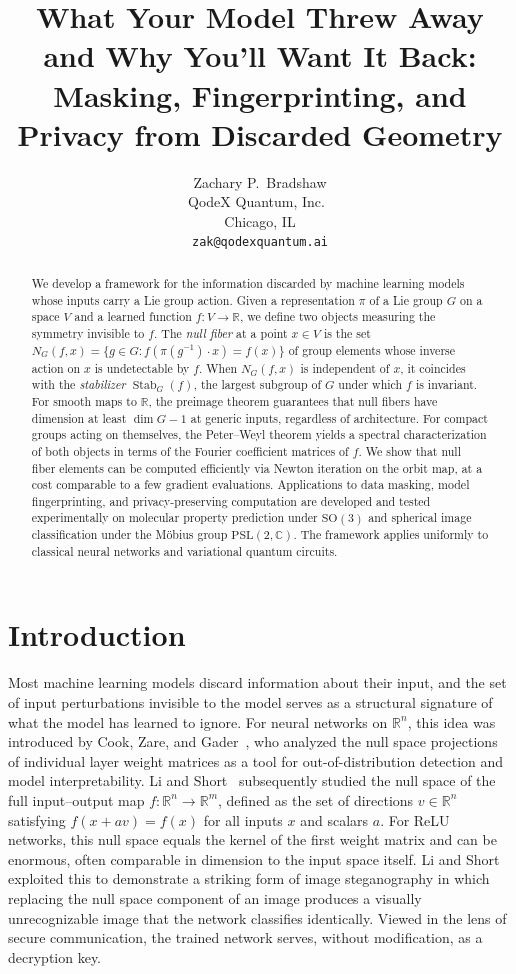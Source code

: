 \documentclass[11pt]{article}
\title{What Your Model Threw Away and Why You'll Want It Back: Masking, Fingerprinting, and Privacy from Discarded Geometry}
\author{
Zachary P.\ Bradshaw \\
QodeX Quantum, Inc.\ \\
Chicago, IL \\
\texttt{zak@qodexquantum.ai}
}
\date{}
\DeclareMathOperator{\Stab}{Stab}
\newcommand{\CC}{\mathbb{C}}
\newcommand{\RR}{\mathbb{R}}
\begin{document}
\maketitle

\begin{abstract}
We develop a framework for the information discarded by machine learning models whose inputs carry a Lie group action. Given a representation $\pi$ of a Lie group $G$ on a space $V$ and a learned function $f\colon V \to \RR$, we define two objects measuring the symmetry invisible to $f$. The \emph{null fiber} at a point $x \in V$ is the set $N_G(f,x) = \{g \in G : f(\pi(g^{-1}) \cdot x) = f(x)\}$ of group elements whose inverse action on $x$ is undetectable by $f$. When $N_G(f,x)$ is independent of $x$, it coincides with the \emph{stabilizer} $\Stab_G(f)$, the largest subgroup of $G$ under which $f$ is invariant. For smooth maps to $\RR$, the preimage theorem guarantees that null fibers have dimension at least $\dim G - 1$ at generic inputs, regardless of architecture. For compact groups acting on themselves, the Peter--Weyl theorem yields a spectral characterization of both objects in terms of the Fourier coefficient matrices of $f$. We show that null fiber elements can be computed efficiently via Newton iteration on the orbit map, at a cost comparable to a few gradient evaluations. Applications to data masking, model fingerprinting, and privacy-preserving computation are developed and tested experimentally on molecular property prediction under $\mathrm{SO}(3)$ and spherical image classification under the M\"obius group $\mathrm{PSL}(2, \CC)$. The framework applies uniformly to classical neural networks and variational quantum circuits.
\end{abstract}

\section{Introduction}\label{sec:intro}

Most machine learning models discard information about their input, and the set of input perturbations invisible to the model serves as a structural signature of what the model has learned to ignore. For neural networks on $\RR^n$, this idea was introduced by Cook, Zare, and Gader~\cite{cook2025competency,cook2020outlier}, who analyzed the null space projections of individual layer weight matrices as a tool for out-of-distribution detection and model interpretability. Li and Short~\cite{li2025null} subsequently studied the null space of the full input--output map $f\colon \RR^n \to \RR^m$, defined as the set of directions $v \in \RR^n$ satisfying $f(x + av) = f(x)$ for all inputs $x$ and scalars $a$. For ReLU networks, this null space equals the kernel of the first weight matrix and can be enormous, often comparable in dimension to the input space itself. Li and Short exploited this to demonstrate a striking form of image steganography in which replacing the null space component of an image produces a visually unrecognizable image that the network classifies identically. Viewed in the lens of secure communication, the trained network serves, without modification, as a decryption key.
\end{document}
